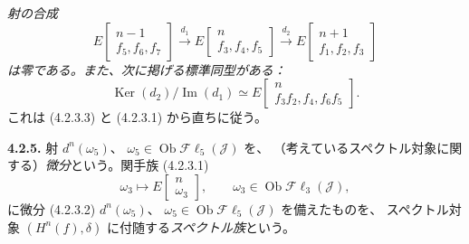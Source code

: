 \clearpage
{}%
\begingroup\small\setlength{\parskip}{0pt}\setlength{\emergencystretch}{2.5em}
\noindent\textit{射の合成}
\[
E\!\begin{bmatrix}n-1\\ f_5,f_6,f_7\end{bmatrix}
\xrightarrow{d_1}
E\!\begin{bmatrix}n\\ f_3,f_4,f_5\end{bmatrix}
\xrightarrow{d_2}
E\!\begin{bmatrix}n+1\\ f_1,f_2,f_3\end{bmatrix}
\]
\textit{は零である。また、次に掲げる標準同型がある：}
\[
\operatorname{Ker}(d_2)\big/\operatorname{Im}(d_1)
\simeq
E\!\begin{bmatrix}n\\ f_3f_2,f_4,f_6f_5\end{bmatrix}.
\tag{4.2.4.1}
\]
これは (4.2.3.3) と (4.2.3.1) から直ちに従う。

\medskip\noindent\textbf{4.2.5.}
射 $d^n(\omega_5)$、
$\omega_5\in\operatorname{Ob}\mathcal{F}\ell_5(\mathcal J)$ を、
（考えているスペクトル対象に関する）\textit{微分}という。関手族 (4.2.3.1)
\[
\omega_3\longmapsto
E\!\begin{bmatrix}n\\ \omega_3\end{bmatrix},
\qquad
\omega_3\in\operatorname{Ob}\mathcal{F}\ell_3(\mathcal J),
\]
に微分 (4.2.3.2) $d^n(\omega_5)$、
$\omega_5\in\operatorname{Ob}\mathcal{F}\ell_5(\mathcal J)$ を備えたものを、
スペクトル対象 $(H^n(f),\delta)$ に付随する\textit{スペクトル族}という。


